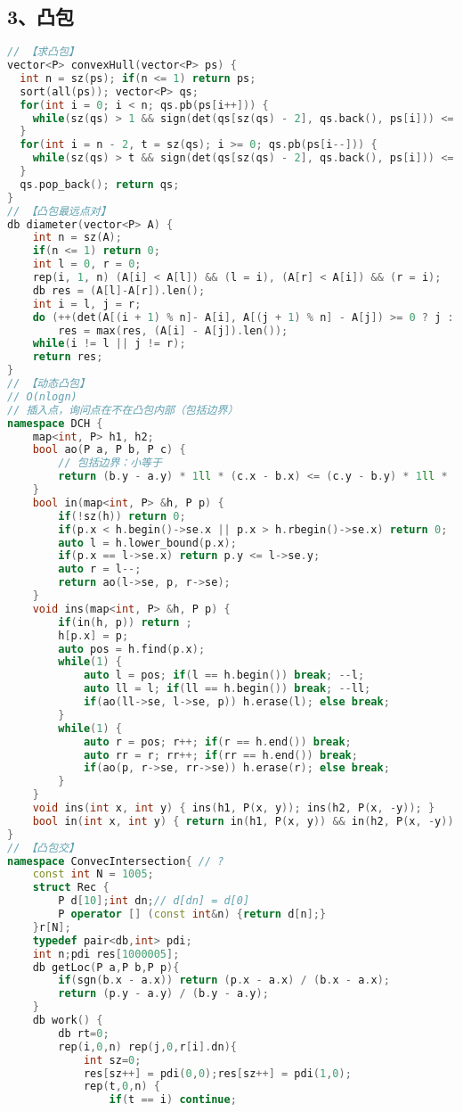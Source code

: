 \subsection{3、凸包}
\begin{lstlisting}[language=C++]
// 【求凸包】
vector<P> convexHull(vector<P> ps) {
  int n = sz(ps); if(n <= 1) return ps;
  sort(all(ps)); vector<P> qs;
  for(int i = 0; i < n; qs.pb(ps[i++])) {
    while(sz(qs) > 1 && sign(det(qs[sz(qs) - 2], qs.back(), ps[i])) <= 0) qs.pop_back();
  }
  for(int i = n - 2, t = sz(qs); i >= 0; qs.pb(ps[i--])) {
    while(sz(qs) > t && sign(det(qs[sz(qs) - 2], qs.back(), ps[i])) <= 0) qs.pop_back();
  }
  qs.pop_back(); return qs;
}
// 【凸包最远点对】
db diameter(vector<P> A) {
	int n = sz(A);
	if(n <= 1) return 0;
	int l = 0, r = 0;
	rep(i, 1, n) (A[i] < A[l]) && (l = i), (A[r] < A[i]) && (r = i);
	db res = (A[l]-A[r]).len();
	int i = l, j = r;
	do (++(det(A[(i + 1) % n]- A[i], A[(j + 1) % n] - A[j]) >= 0 ? j : i)) %= n,
		res = max(res, (A[i] - A[j]).len());
	while(i != l || j != r);
	return res;
}
// 【动态凸包】
// O(nlogn)
// 插入点，询问点在不在凸包内部（包括边界）
namespace DCH {
	map<int, P> h1, h2;
	bool ao(P a, P b, P c) {
		// 包括边界：小等于
		return (b.y - a.y) * 1ll * (c.x - b.x) <= (c.y - b.y) * 1ll * (b.x - a.x);
	}
	bool in(map<int, P> &h, P p) {
		if(!sz(h)) return 0;
		if(p.x < h.begin()->se.x || p.x > h.rbegin()->se.x) return 0;
		auto l = h.lower_bound(p.x);
		if(p.x == l->se.x) return p.y <= l->se.y;
		auto r = l--;
		return ao(l->se, p, r->se);
	}
	void ins(map<int, P> &h, P p) {
		if(in(h, p)) return ;
		h[p.x] = p;
		auto pos = h.find(p.x);
		while(1) {
			auto l = pos; if(l == h.begin()) break; --l;
			auto ll = l; if(ll == h.begin()) break; --ll;
			if(ao(ll->se, l->se, p)) h.erase(l); else break;
		}
		while(1) {
			auto r = pos; r++; if(r == h.end()) break;
			auto rr = r; rr++; if(rr == h.end()) break;
			if(ao(p, r->se, rr->se)) h.erase(r); else break;
		}
	}
	void ins(int x, int y) { ins(h1, P(x, y)); ins(h2, P(x, -y)); }
	bool in(int x, int y) { return in(h1, P(x, y)) && in(h2, P(x, -y)); }
}
// 【凸包交】
namespace ConvecIntersection{ // ?
	const int N = 1005;
	struct Rec {
		P d[10];int dn;// d[dn] = d[0]
		P operator [] (const int&n) {return d[n];}
	}r[N];
	typedef pair<db,int> pdi;
	int n;pdi res[1000005];
	db getLoc(P a,P b,P p){
		if(sgn(b.x - a.x)) return (p.x - a.x) / (b.x - a.x);
		return (p.y - a.y) / (b.y - a.y);
	}
	db work() {
		db rt=0;
		rep(i,0,n) rep(j,0,r[i].dn){
			int sz=0;
			res[sz++] = pdi(0,0);res[sz++] = pdi(1,0);
			rep(t,0,n) {
				if(t == i) continue;

\end{lstlisting}
